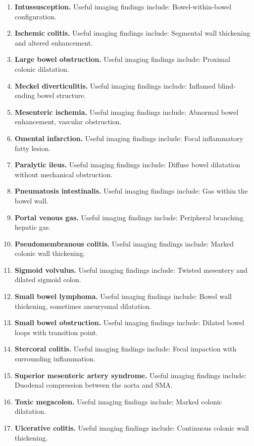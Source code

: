 \begin{enumerate}[leftmargin=*,itemsep=0.45em,topsep=0.4em]
\item \textbf{Intussusception.} Useful imaging findings include: Bowel-within-bowel configuration.
\item \textbf{Ischemic colitis.} Useful imaging findings include: Segmental wall thickening and altered enhancement.
\item \textbf{Large bowel obstruction.} Useful imaging findings include: Proximal colonic dilatation.
\item \textbf{Meckel diverticulitis.} Useful imaging findings include: Inflamed blind-ending bowel structure.
\item \textbf{Mesenteric ischemia.} Useful imaging findings include: Abnormal bowel enhancement, vascular obstruction.
\item \textbf{Omental infarction.} Useful imaging findings include: Focal inflammatory fatty lesion.
\item \textbf{Paralytic ileus.} Useful imaging findings include: Diffuse bowel dilatation without mechanical obstruction.
\item \textbf{Pneumatosis intestinalis.} Useful imaging findings include: Gas within the bowel wall.
\item \textbf{Portal venous gas.} Useful imaging findings include: Peripheral branching hepatic gas.
\item \textbf{Pseudomembranous colitis.} Useful imaging findings include: Marked colonic wall thickening.
\item \textbf{Sigmoid volvulus.} Useful imaging findings include: Twisted mesentery and dilated sigmoid colon.
\item \textbf{Small bowel lymphoma.} Useful imaging findings include: Bowel wall thickening, sometimes aneurysmal dilatation.
\item \textbf{Small bowel obstruction.} Useful imaging findings include: Dilated bowel loops with transition point.
\item \textbf{Stercoral colitis.} Useful imaging findings include: Fecal impaction with surrounding inflammation.
\item \textbf{Superior mesenteric artery syndrome.} Useful imaging findings include: Duodenal compression between the aorta and SMA.
\item \textbf{Toxic megacolon.} Useful imaging findings include: Marked colonic dilatation.
\item \textbf{Ulcerative colitis.} Useful imaging findings include: Continuous colonic wall thickening.
\end{enumerate}

